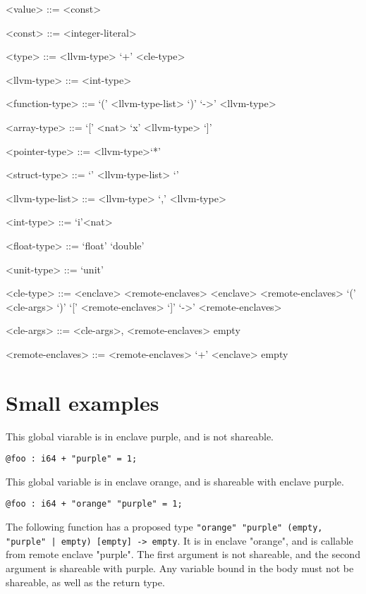 \documentclass{article}
\begin{document}
\begin{grammar}
<value> ::= <const>

<const> ::= <integer-literal>

<type> ::= <llvm-type> `+' <cle-type>

<llvm-type> ::= <int-type>

<function-type> ::= `(' <llvm-type-list> `)' `->' <llvm-type>

<array-type> ::= `[' <nat> `x' <llvm-type> `]'

<pointer-type> ::= <llvm-type>`*'

<struct-type> ::= `{' <llvm-type-list> `}'

<llvm-type-list> ::= <llvm-type>
`,' <llvm-type>

<int-type> ::= `i'<nat>

<float-type> ::= `float' 
\alt `double'

<unit-type> ::= `unit'

<cle-type> ::= <enclave> <remote-enclaves> 
\alt <enclave> <remote-enclaves> `(' <cle-args> `)' `[' <remote-enclaves> `]' `->' <remote-enclaves> 

<cle-args> ::= <cle-args>, <remote-enclaves> \alt empty

<remote-enclaves> ::=  <remote-enclaves> `+' <enclave> \alt empty 

\end{grammar}

\section{Small examples}

This global viarable is in enclave purple, and is not shareable.
\begin{verbatim}
@foo : i64 + "purple" = 1;
\end{verbatim}


This global variable is in enclave orange, and is shareable with enclave purple.
\begin{verbatim}
@foo : i64 + "orange" "purple" = 1;
\end{verbatim}

The following function has a proposed type \texttt{"orange" "purple" (empty, "purple" | empty) [empty] -> empty}.
It is in enclave "orange", and is callable from remote enclave "purple".
The first argument is not shareable, 
and the second argument is shareable with purple. 
Any variable bound in the body must not be shareable, as well as the return type.
\end{document}
